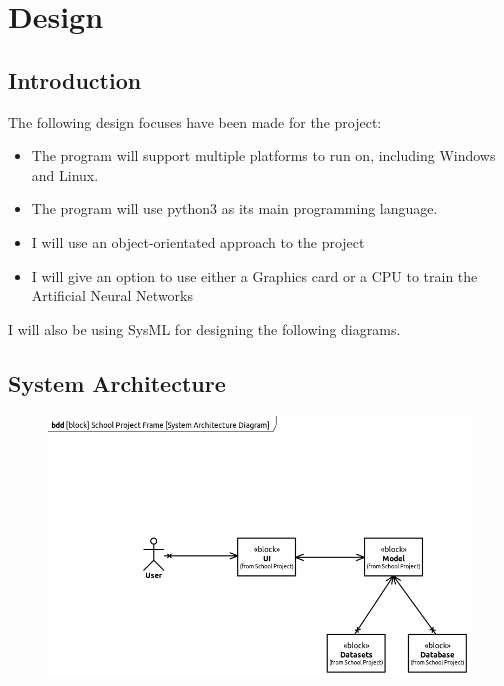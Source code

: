 \documentclass[./project-report/src/latex/project-report.tex]{subfiles}
\begin{document}
\maketitle

\section{Design}

\subsection{Introduction}

The following design focuses have been made for the project:

\begin{itemize}
    \item The program will support multiple platforms to run on, including Windows and Linux.
    \item The program will use python3 as its main programming language.
    \item I will use an object-orientated approach to the project
    \item I will give an option to use either a Graphics card or a CPU to train the Artificial Neural Networks
\end{itemize}

I will also be using SysML for designing the following diagrams.

\subsection{System Architecture}

\begin{figure}[h!]
\centering
\includegraphics[width=1\textwidth]{./project-report/src/images/system-architecture-diagram.png}
\end{figure}
\end{document}
